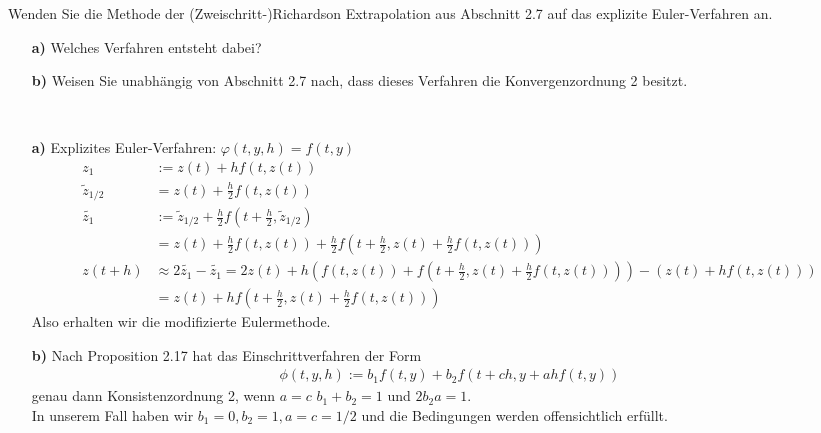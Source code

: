 \begin{exercise}
Wenden Sie die Methode der (Zweischritt-)Richardson Extrapolation aus Abschnitt
2.7 auf das explizite Euler-Verfahren an.
\begin{itemize}
  \item [\textbf{a)}] Welches Verfahren entsteht dabei?
  \item [\textbf{b)}] Weisen Sie unabhängig von Abschnitt 2.7 nach, dass dieses
  Verfahren die Konvergenzordnung 2 besitzt.
\end{itemize}
\end{exercise}
\begin{solution}
\leavevmode \\
\begin{itemize}
  \item [\textbf{a)}] Explizites Euler-Verfahren: $\varphi(t,y,h) = f(t,y)$
  \begin{align*}
    z_1 &:= z(t) + hf(t,z(t)) \\
    \widetilde{z}_{1/2} &= z(t) + \frac{h}{2}f(t,z(t)) \\
  \widetilde{z_1} &:= \widetilde{z}_{1/2} + \frac{h}{2}f(t + \frac{h}{2},\widetilde{z}_{1/2}) \\
  &= z(t) + \frac{h}{2}f(t,z(t)) + \frac{h}{2}f(t + \frac{h}{2},z(t) + \frac{h}{2}f(t,z(t))) \\
    z(t + h) &\approx 2\widetilde{z_1} - \widetilde{z_1}
    = 2z(t) + h\left(f(t,z(t))+ f(t+\frac{h}{2},z(t)+\frac{h}{2}f(t,z(t)))\right) -
    (z(t) + hf(t,z(t))) \\
    &= z(t) + hf(t+\frac{h}{2},z(t)+\frac{h}{2}f(t,z(t)))
  \end{align*}
  Also erhalten wir die modifizierte Eulermethode.
  \item [\textbf{b)}] Nach Proposition 2.17 hat das Einschrittverfahren der Form
  \begin{align*}
    \phi(t,y,h) := b_1f(t,y) + b_2f(t+ch,y+ahf(t,y))
  \end{align*}
  genau dann Konsistenzordnung 2, wenn $a = c$ $b_1 + b_2 = 1$ und $2b_2a = 1$. \\
  In unserem Fall haben wir $b_1 = 0, b_2 = 1, a = c = 1/2$ und die Bedingungen
  werden offensichtlich erfüllt.
\end{itemize}
\end{solution}
